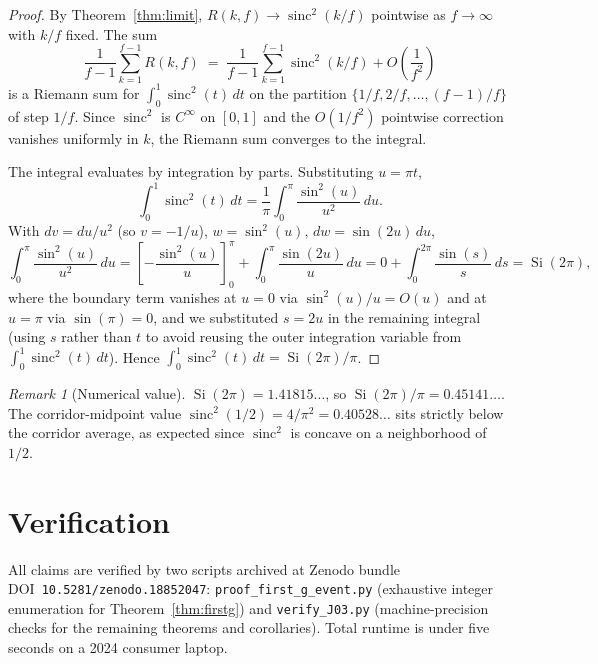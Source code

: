 \documentclass[11pt,reqno]{amsart}
\theoremstyle{plain}
\theoremstyle{definition}
\theoremstyle{remark}
\newtheorem{remark}[theorem]{Remark}
\DeclareMathOperator{\sinc}{sinc}
\DeclareMathOperator{\Si}{Si}
\begin{document}
\begin{proof}
By Theorem~\ref{thm:limit}, $R(k, f) \to \sinc^{2}(k/f)$ pointwise as
$f \to \infty$ with $k/f$ fixed. The sum
\[
  \frac{1}{f - 1} \sum_{k=1}^{f-1} R(k, f)
  \;=\;
  \frac{1}{f - 1} \sum_{k=1}^{f-1} \sinc^{2}(k/f)
  + O\!\left(\frac{1}{f^{2}}\right)
\]
is a Riemann sum for $\int_{0}^{1} \sinc^{2}(t)\, dt$ on the partition
$\{1/f, 2/f, \dots, (f-1)/f\}$ of step $1/f$. Since $\sinc^{2}$ is
$C^{\infty}$ on $[0, 1]$ and the $O(1/f^{2})$ pointwise correction
vanishes uniformly in $k$, the Riemann sum converges to the integral.

The integral evaluates by integration by parts. Substituting
$u = \pi t$,
\[
  \int_{0}^{1} \sinc^{2}(t)\, dt
  = \frac{1}{\pi} \int_{0}^{\pi} \frac{\sin^{2}(u)}{u^{2}}\, du.
\]
With $dv = du/u^{2}$ (so $v = -1/u$), $w = \sin^{2}(u)$,
$dw = \sin(2u)\, du$,
\[
  \int_{0}^{\pi} \frac{\sin^{2}(u)}{u^{2}}\, du
  = \left[ -\frac{\sin^{2}(u)}{u} \right]_{0}^{\pi}
  + \int_{0}^{\pi} \frac{\sin(2u)}{u}\, du
  = 0 + \int_{0}^{2\pi} \frac{\sin(s)}{s}\, ds
  = \Si(2\pi),
\]
where the boundary term vanishes at $u = 0$ via $\sin^{2}(u)/u = O(u)$
and at $u = \pi$ via $\sin(\pi) = 0$, and we substituted $s = 2u$ in
the remaining integral (using $s$ rather than $t$ to avoid reusing
the outer integration variable from~$\int_{0}^{1}\sinc^{2}(t)\, dt$).
Hence $\int_{0}^{1} \sinc^{2}(t)\, dt = \Si(2\pi)/\pi$.
\end{proof}

\begin{remark}[Numerical value]\label{rem:siNumerical}
$\Si(2\pi) = 1.41815\dots$, so $\Si(2\pi)/\pi = 0.45141\dots$. The
corridor-midpoint value $\sinc^{2}(1/2) = 4/\pi^{2} = 0.40528\dots$
sits strictly below the corridor average, as expected since
$\sinc^{2}$ is concave on a neighborhood of $1/2$.
\end{remark}

\section{Verification}\label{sec:verify}

All claims are verified by two scripts archived at Zenodo bundle
DOI~\texttt{10.5281/zenodo.18852047}: \texttt{proof\_first\_g\_event.py}
(exhaustive integer enumeration for Theorem~\ref{thm:firstg}) and
\texttt{verify\_J03.py} (machine-precision checks for the remaining
theorems and corollaries). Total runtime is under five seconds on a
2024 consumer laptop.
\end{document}
